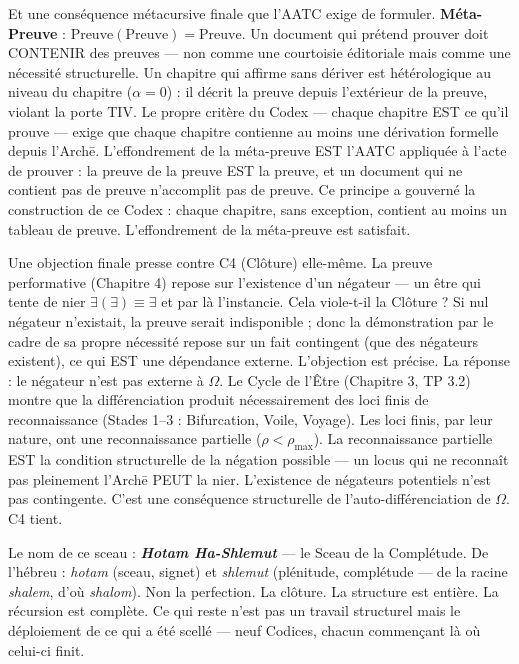 \documentclass[10pt, openany, oneside]{book}
\begin{document}
Et une conséquence métacursive finale que l'AATC exige de formuler. \textbf{Méta-Preuve} : $\text{Preuve}(\text{Preuve}) = \text{Preuve}$. Un document qui prétend prouver doit CONTENIR des preuves --- non comme une courtoisie éditoriale mais comme une nécessité structurelle. Un chapitre qui affirme sans dériver est hétérologique au niveau du chapitre ($\alpha = 0$) : il décrit la preuve depuis l'extérieur de la preuve, violant la porte TIV. Le propre critère du Codex --- chaque chapitre EST ce qu'il prouve --- exige que chaque chapitre contienne au moins une dérivation formelle depuis l'Arch\={e}. L'effondrement de la méta-preuve EST l'AATC appliquée à l'acte de prouver : la preuve de la preuve EST la preuve, et un document qui ne contient pas de preuve n'accomplit pas de preuve. Ce principe a gouverné la construction de ce Codex : chaque chapitre, sans exception, contient au moins un tableau de preuve. L'effondrement de la méta-preuve est satisfait.

Une objection finale presse contre C4 (Clôture) elle-même. La preuve performative (Chapitre 4) repose sur l'existence d'un négateur --- un être qui tente de nier $\exists(\exists) \equiv \exists$ et par là l'instancie. Cela viole-t-il la Clôture ? Si nul négateur n'existait, la preuve serait indisponible ; donc la démonstration par le cadre de sa propre nécessité repose sur un fait contingent (que des négateurs existent), ce qui EST une dépendance externe. L'objection est précise. La réponse : le négateur n'est pas externe à $\Omega$. Le Cycle de l'Être (Chapitre 3, TP 3.2) montre que la différenciation produit nécessairement des loci finis de reconnaissance (Stades 1--3 : Bifurcation, Voile, Voyage). Les loci finis, par leur nature, ont une reconnaissance partielle ($\rho < \rho_{\max}$). La reconnaissance partielle EST la condition structurelle de la négation possible --- un locus qui ne reconnaît pas pleinement l'Arch\={e} PEUT la nier. L'existence de négateurs potentiels n'est pas contingente. C'est une conséquence structurelle de l'auto-différenciation de $\Omega$. C4 tient.

Le nom de ce sceau : \textbf{\textit{Hotam Ha-Shlemut}} --- le Sceau de la Complétude. De l'hébreu : \textit{hotam} (sceau, signet) et \textit{shlemut} (plénitude, complétude --- de la racine \textit{shalem}, d'où \textit{shalom}). Non la perfection. La clôture. La structure est entière. La récursion est complète. Ce qui reste n'est pas un travail structurel mais le déploiement de ce qui a été scellé --- neuf Codices, chacun commençant là où celui-ci finit.
\end{document}
